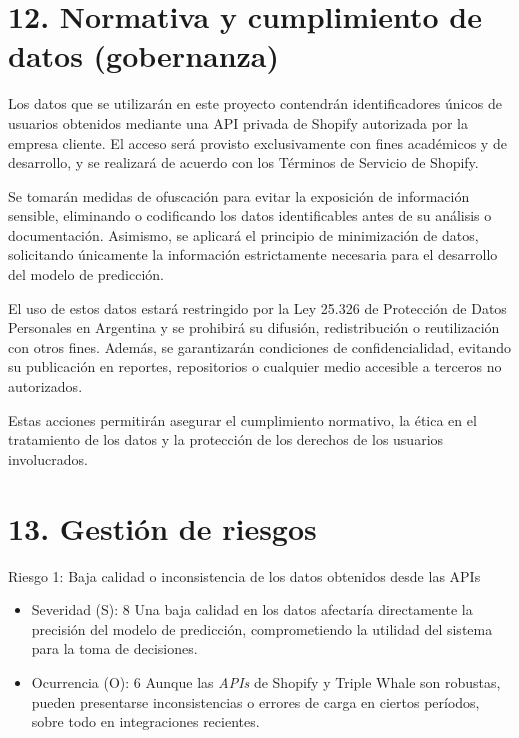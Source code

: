 \documentclass[
11pt, %
]{charter}
\begin{document}
\section{12. Normativa y cumplimiento de datos (gobernanza)}


Los datos que se utilizarán en este proyecto contendrán identificadores únicos de usuarios obtenidos mediante una API privada de Shopify autorizada por la empresa cliente. El acceso será provisto exclusivamente con fines académicos y de desarrollo, y se realizará de acuerdo con los Términos de Servicio de Shopify.

Se tomarán medidas de ofuscación para evitar la exposición de información sensible, eliminando o codificando los datos identificables antes de su análisis o documentación. Asimismo, se aplicará el principio de minimización de datos, solicitando únicamente la información estrictamente necesaria para el desarrollo del modelo de predicción.

El uso de estos datos estará restringido por la Ley 25.326 de Protección de Datos Personales en Argentina y se prohibirá su difusión, redistribución o reutilización con otros fines. Además, se garantizarán condiciones de confidencialidad, evitando su publicación en reportes, repositorios o cualquier medio accesible a terceros no autorizados.

Estas acciones permitirán asegurar el cumplimiento normativo, la ética en el tratamiento de los datos y la protección de los derechos de los usuarios involucrados.



\section{13. Gestión de riesgos}
\label{sec:riesgos}


Riesgo 1: Baja calidad o inconsistencia de los datos obtenidos desde las APIs
\begin{itemize}
\item Severidad (S): 8
Una baja calidad en los datos afectaría directamente la precisión del modelo de predicción, comprometiendo la utilidad del sistema para la toma de decisiones.

\item Ocurrencia (O): 6
Aunque las \textit{APIs} de Shopify y Triple Whale son robustas, pueden presentarse inconsistencias o errores de carga en ciertos períodos, sobre todo en integraciones recientes.
\end{itemize}
\end{document}
